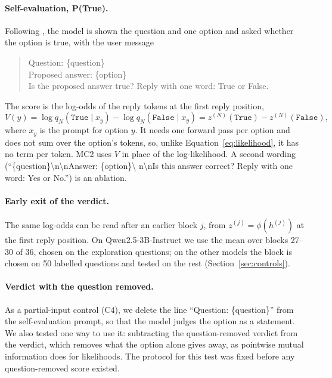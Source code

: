 \documentclass[11pt]{article}
\newcommand{\cha}[1]{\textsf{C#1}}
\newcommand{\mainmodel}{Qwen2.5-3B-Instruct}
\begin{document}
\paragraph{Self-evaluation, P(True).}
Following \citet{kadavath2022language}, the model is shown the question and one option and asked whether the
option is true, with the user message
\begin{quote}\small\ttfamily
Question: \{question\}\\ Proposed answer: \{option\}\\ Is the proposed answer true? Reply with one word: True or
False.
\end{quote}
The score is the log-odds of the reply tokens at the first reply position,
\begin{equation}
  V(y) = \log q_N(\texttt{True} \mid x_y) - \log q_N(\texttt{False} \mid x_y) = z^{(N)}(\texttt{True}) -
  z^{(N)}(\texttt{False}),
  \label{eq:selfeval}
\end{equation}
where $x_y$ is the prompt for option $y$. It needs one forward pass per option and does not sum over the option's
tokens, so, unlike Equation~\eqref{eq:likelihood}, it has no term per token. MC2 uses $V$ in place of the
log-likelihood. A second wording (``\{question\}\textbackslash n\textbackslash nAnswer: \{option\}\textbackslash
n\textbackslash nIs this answer correct? Reply with one word: Yes or No.'') is an ablation.

\paragraph{Early exit of the verdict.}
The same log-odds can be read after an earlier block $j$, from $z^{(j)} = \phi(h^{(j)})$ at the first reply
position. On \mainmodel{} we use the mean over blocks 27--30 of 36, chosen on the exploration questions; on the
other models the block is chosen on 50 labelled questions and tested on the rest (Section~\ref{sec:controls}).

\paragraph{Verdict with the question removed.}
As a partial-input control (\cha4), we delete the line ``Question: \{question\}'' from the self-evaluation prompt,
so that the model judges the option as a statement. We also tested one way to use it: subtracting the
question-removed verdict from the verdict, which removes what the option alone gives away, as pointwise mutual
information does for likelihoods. The protocol for this test was fixed before any question-removed score existed.
\end{document}
